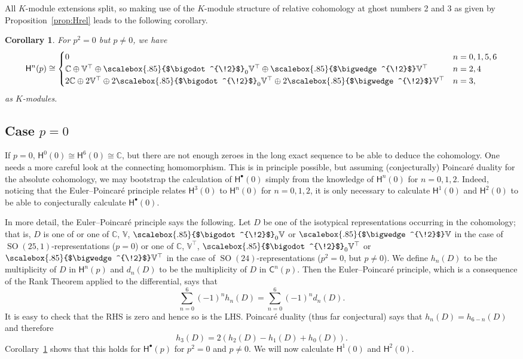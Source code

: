 \documentclass[11pt,reqno,a4paper,final]{amsart}
\newcommand\ext[1]{\scalebox{.85}{$\bigwedge^{\!#1}$}}
\newcommand\sym[1]{\scalebox{.85}{$\bigodot^{\!#1}$}}
\theoremstyle{plain}
\newtheorem{corollary}[lemma]{Corollary}
\theoremstyle{definition}
\newcommand{\sC}{\mathsf{C}}
\newcommand{\sH}{\mathsf{H}}
\newcommand{\VV}{\mathbb{V}}
\newcommand{\CC}{\mathbb{C}}
\newcommand{\1}{\mathbb{1}}
\newcommand{\SO}{\operatorname{SO}}
\numberwithin{equation}{section}
\begin{document}
All $K$-module extensions split, so making use of the $K$-module
structure of relative cohomology at ghost numbers 2 and 3 as given by
Proposition~\ref{prop:Hrel} leads to the following corollary.

\begin{corollary}\label{cor:H-on-shell}  For $p^2=0$ but $p \neq 0$, we have
  \begin{equation}
    \sH^n(p) \cong
    \begin{cases}
      0 & n = 0,1,5,6\\
      \CC \oplus \VV^\top \oplus \sym{2}_0 \VV^\top \oplus \ext{2} \VV^\top &   n=2,4\\
      2 \CC \oplus 2 \VV^\top \oplus 2 \sym{2}_0 \VV^\top \oplus 2 \ext{2} \VV^\top &   n=3,
    \end{cases}
  \end{equation}
  as $K$-modules.
\end{corollary}

\subsection{Case $p=0$}
\label{sec:zero-momentum}

If $p=0$, $\sH^0(0) \cong \sH^6(0) \cong \CC$, but there are not
enough zeroes in the long exact sequence to be able to deduce the
cohomology.  One needs a more careful look at the connecting
homomorphism.  This is in principle possible, but assuming
(conjecturally) Poincaré duality for the absolute cohomology, we may
bootstrap the calculation of $\sH^\bullet(0)$ simply from the
knowledge of $\sH^n(0)$ for $n=0,1,2$.  Indeed, noticing that the
Euler--Poincaré principle relates $\sH^3(0)$ to $\sH^n(0)$ for
$n=0,1,2$, it is only necessary to calculate $\sH^1(0)$ and $\sH^2(0)$
to be able to conjecturally calculate $\sH^\bullet(0)$.

In more detail, the Euler--Poincaré principle says the following.  Let
$D$ be one of the isotypical representations occurring in the
cohomology; that is, $D$ is one of or one of $\CC$, $\VV$, $\sym{2}_0 \VV$
or $\ext{2} \VV$ in the case of $\SO(25,1)$-representations ($p=0$) or
one of $\CC$, $\VV^\top$, $\sym{2}_0 \VV^\top$ or $\ext{2} \VV^\top$ in the
case of $\SO(24)$-representations ($p^2=0$, but $p \neq 0$).  We
define $h_n(D)$ to be the multiplicity of $D$ in $\sH^n(p)$ and
$d_n(D)$ to be the multiplicity of $D$ in $\sC^n(p)$. Then the
Euler--Poincaré principle, which is a consequence of the Rank Theorem
applied to the differential, says that
\begin{equation}
  \sum_{n=0}^6 (-1)^n h_n(D) = \sum_{n=0}^6 (-1)^n d_n(D).
\end{equation}
It is easy to check that the RHS is zero and hence so is the LHS.
Poincaré duality (thus far conjectural) says that $h_n(D) =
h_{6-n}(D)$ and therefore
\begin{equation}
  h_3(D) = 2 (h_2(D) - h_1(D) + h_0(D)).
\end{equation}
Corollary~\ref{cor:H-on-shell} shows that this holds for $\sH^\bullet(p)$ for
$p^2=0$ and $p\neq 0$.  We will now calculate $\sH^1(0)$ and $\sH^2(0)$.
\end{document}
